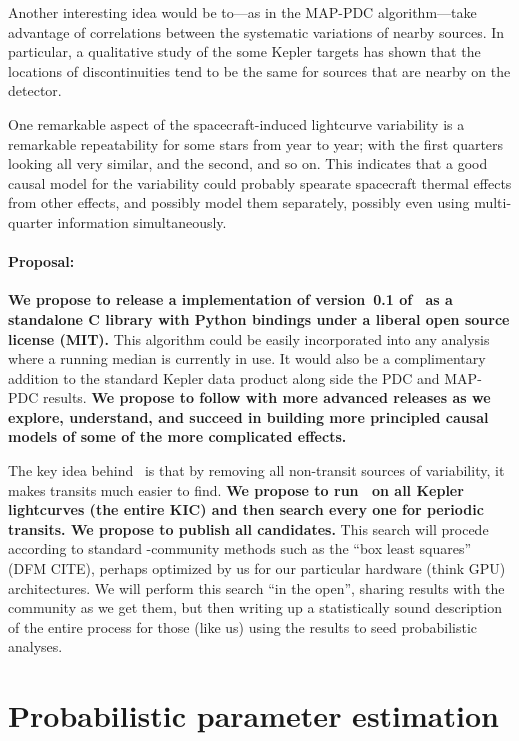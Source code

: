 \documentclass[letterpaper,12pt,preprint]{hack_aastex}
\newcommand{\Untrendy}{\package{Untrendy}}
\begin{document}
Another interesting idea would be to---as in the MAP-PDC algorithm---take
advantage of correlations between the systematic variations of nearby sources.
In particular, a qualitative study of the some Kepler targets has shown that
the locations of discontinuities tend to be the same for sources that are
nearby on the detector.

One remarkable aspect of the spacecraft-induced lightcurve variability is
a remarkable repeatability for some stars from year to year; with the
first quarters looking all very similar, and the second, and so on.
This indicates that a good causal model for the variability could probably
spearate spacecraft thermal effects from other effects, and possibly model
them separately, possibly even using multi-quarter information simultaneously.

\paragraph{Proposal:}
\textbf{We propose to release a implementation of version~0.1 of \Untrendy\ as a standalone C
library with Python bindings under a liberal open source license (MIT).}
This algorithm could be easily incorporated into any analysis where a running
median is currently in use.
It would also be a complimentary addition to the standard Kepler data
product along side the PDC and MAP-PDC results.
\textbf{We propose to follow with more advanced releases as we explore,
understand, and succeed in building more principled causal models of some
of the more complicated effects.}

The key idea behind \Untrendy\ is that by removing all non-transit
sources of variability, it makes transits much easier to find.
\textbf{We propose to run \Untrendy\ on all Kepler lightcurves (the
  entire KIC) and then search every one for periodic transits.  We
  propose to publish all candidates.}
This search will procede
according to standard \Kepler-community methods such as the ``box
least squares'' (DFM CITE), perhaps optimized by us for our particular
hardware (think GPU) architectures.
We will perform this search ``in
the open'', sharing results with the community as we get them, but
then writing up a statistically sound description of the entire
process for those (like us) using the results to seed probabilistic
analyses.


\section{Probabilistic parameter estimation}
\end{document}
